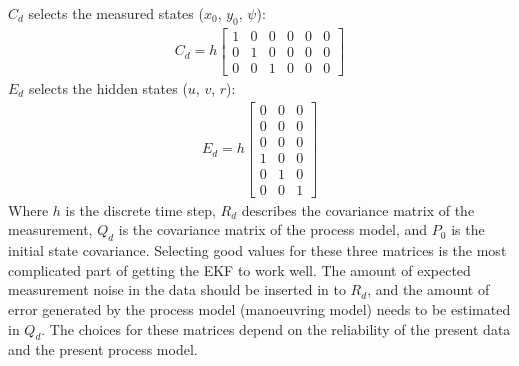 \documentclass[review]{elsarticle}
\begin{document}
\sphinxAtStartPar
\(C_d\) selects the measured states (\(x_0\), \(y_0\), \(\psi\)):
\begin{equation}\label{equation:04.01_EK:eqcd}
\begin{split}\displaystyle C_{d} = h \left[\begin{matrix}1 & 0 & 0 & 0 & 0 & 0\\0 & 1 & 0 & 0 & 0 & 0\\0 & 0 & 1 & 0 & 0 & 0\end{matrix}\right]\end{split}
\end{equation}
\sphinxAtStartPar
\(E_d\) selects the hidden states (\(u\), \(v\), \(r\)):
\begin{equation}\label{equation:04.01_EK:eqed}
\begin{split}\displaystyle E_{d} = h \left[\begin{matrix}0 & 0 & 0\\0 & 0 & 0\\0 & 0 & 0\\1 & 0 & 0\\0 & 1 & 0\\0 & 0 & 1\end{matrix}\right]\end{split}
\end{equation}
\sphinxAtStartPar
Where \(h\) is the discrete time step, \(R_d\) describes the covariance matrix of the measurement, \(Q_d\) is the covariance matrix of the process model, and \(P_0\) is the initial state covariance.
Selecting good values for these three matrices is the most complicated part of getting the EKF to work well. The amount of expected measurement noise in the data should be inserted in to \(R_d\), and the amount of error generated by the process model (manoeuvring model) needs to be estimated in \(Q_d\). The choices for these matrices depend on the reliability of the present data and the present process model.
\end{document}
